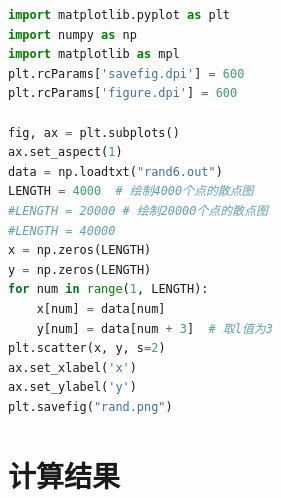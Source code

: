 \documentclass[12pt,a4paper,utf8]{ctexart}
\begin{document}
\begin{framed}
\begin{lstlisting}[language=python]
import matplotlib.pyplot as plt
import numpy as np
import matplotlib as mpl
plt.rcParams['savefig.dpi'] = 600
plt.rcParams['figure.dpi'] = 600

fig, ax = plt.subplots()
ax.set_aspect(1)
data = np.loadtxt("rand6.out")
LENGTH = 4000  # 绘制4000个点的散点图
#LENGTH = 20000 # 绘制20000个点的散点图
#LENGTH = 40000
x = np.zeros(LENGTH)
y = np.zeros(LENGTH)
for num in range(1, LENGTH):
    x[num] = data[num]
    y[num] = data[num + 3]  # 取l值为3  
plt.scatter(x, y, s=2)
ax.set_xlabel('x')
ax.set_ylabel('y')
plt.savefig("rand.png")
\end{lstlisting}
\end{framed}
\newpage
\section{计算结果}
\end{document}
